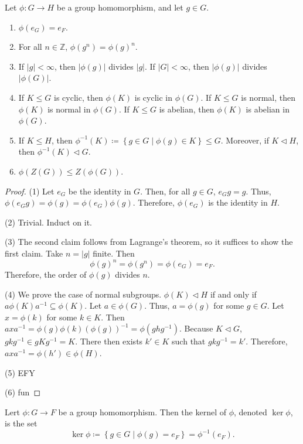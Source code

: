 \begin{theorem}\label{thm:bwaaaaa}
	Let $\phi : G \to H$ be a group homomorphism, and let $g\in G$.
	\begin{enumerate}
		\item $\phi (e_G)=e_F$.
		\item For all $n\in\mathbb{Z}$, $\phi (g^n)=\phi (g)^n$.
		\item If $\left| g \right| <\infty$, then $\left| \phi (g) \right| $ divides $\left| g \right| $. If $\left| G \right| <\infty$, then $\left| \phi (g) \right| $ divides $\left| \phi (G) \right| $.
		\item If $K\leq G$ is cyclic, then $\phi (K)$ is cyclic in $\phi (G)$. If $K\leq G$ is normal, then $\phi (K)$ is normal in $\phi (G)$. If $K\leq G$ is abelian, then $\phi (K)$ is abelian in $\phi (G)$.
		\item If $K\leq H$, then $\phi ^{-1}(K)\coloneqq \left\{ g\in G \mid \phi (g)\in K \right\} \leq G$. Moreover, if $K\triangleleft H$, then $\phi ^{-1}(K)\triangleleft G$.
		\item $\phi (Z(G))\leq Z(\phi (G))$.
	\end{enumerate}
\end{theorem}
\begin{proof}
	(1) Let $e_G$ be the identity in $G$. Then, for all $g\in G$, $e_Gg=g$. Thus, $\phi (e_Gg)=\phi (g)=\phi (e_G)\phi (g)$. Therefore, $\phi (e_G)$ is the identity in $H$.

	(2) Trivial. Induct on it.

	(3) The second claim follows from Lagrange's theorem, so it suffices to show the first claim. Take $n=\left| g \right| $ finite. Then
	\[
		\phi (g)^n=\phi \left( g^n \right) =\phi (e_G)=e_F
	.\]
	Therefore, the order of $\phi (g)$ divides $n$.

	(4) We prove the case of normal subgroups. $\phi (K)\triangleleft H$ if and only if $a\phi (K)a^{-1}\subseteq \phi (K)$. Let $a\in\phi (G)$. Thus, $a=\phi (g)$ for some $g\in G$. Let $x=\phi (k)$ for some $k\in K$. Then $axa^{-1}=\phi (g)\phi (k)\left( \phi (g) \right) ^{-1}=\phi (ghg^{-1})$. Because $K\triangleleft G$, $gkg^{-1}\in gKg^{-1}=K$. There then exists $k'\in K$ such that $gkg^{-1}=k'$. Therefore, $axa^{-1}=\phi (h')\in\phi (H)$.

	(5) EFY

	(6) fun
\end{proof}

\begin{definition}[Kernel]\label{dfn:kjx}
	Lert $\phi  : G \to F$ be a group homomorphism. Then the kernel of $\phi $, denoted $\ker \phi $, is the set
	\[
		\ker \phi \coloneqq \left\{ g\in G \mid \phi (g)=e_F \right\} =\phi ^{-1}(e_F)
	.\]
\end{definition}

